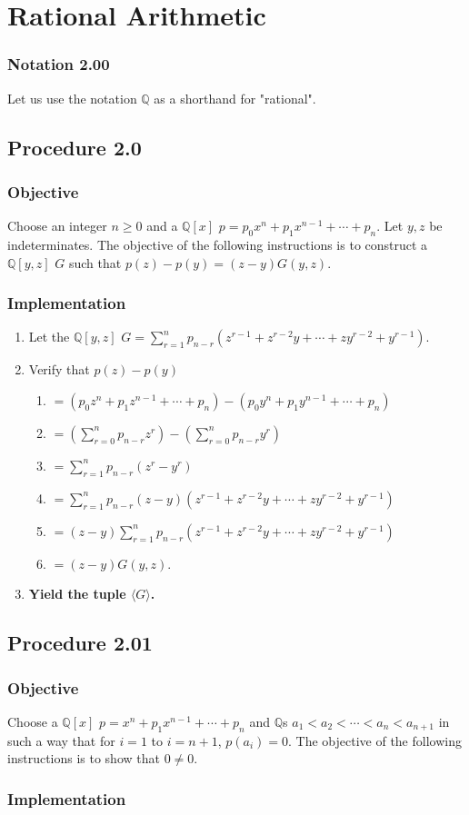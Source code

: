 \documentclass[twocolumn]{article}
\newcommand{\notation}[1]{\subsubsection*{Notation #1}}
\newcommand{\procedure}[2][]{\subsection*{Procedure #2 \ifthenelse{\equal{#1}{}}{}{(#1)}}\label{sec:procedure #2}}
\newcommand{\objective}{\subsubsection*{Objective}}
\newcommand{\implementation}{\subsubsection*{Implementation}}
\begin{document}
	\section{Rational Arithmetic}
		\notation{2.00}
			Let us use the notation $\mathbb{Q}$ as a shorthand for "rational".
		\procedure{2.0}
			\objective
				Choose an integer $n\ge 0$ and a $\mathbb{Q}[x]$ $p=p_0x^n+p_1x^{n-1}+\cdots+p_n$. Let $y,z$ be indeterminates. The objective of the following instructions is to construct a $\mathbb{Q}[y,z]$ $G$ such that $p(z)-p(y)=(z-y)G(y,z)$.
			\implementation
				\begin{enumerate}
					\item Let the $\mathbb{Q}[y,z]$ $G=\sum_{r=1}^n p_{n-r}(z^{r-1}+z^{r-2}y+\cdots+zy^{r-2}+y^{r-1})$.
					\item Verify that $p(z)-p(y)$
					\begin{enumerate}
						\item $=(p_0z^n+p_1z^{n-1}+\cdots+p_n)-(p_0y^n+p_1y^{n-1}+\cdots+p_n)$
						\item $=(\sum_{r=0}^n p_{n-r}z^r)-(\sum_{r=0}^n p_{n-r}y^r)$
						\item $=\sum_{r=1}^n p_{n-r}(z^r-y^r)$
						\item $=\sum_{r=1}^n p_{n-r}(z-y)(z^{r-1}+z^{r-2}y+\cdots+zy^{r-2}+y^{r-1})$
						\item $=(z-y)\sum_{r=1}^n p_{n-r}(z^{r-1}+z^{r-2}y+\cdots+zy^{r-2}+y^{r-1})$
						\item $=(z-y)G(y,z)$.
					\end{enumerate}
					\item \textbf{Yield the tuple $\langle G\rangle$.}
				\end{enumerate}
		\procedure{2.01}
			\objective
				Choose a $\mathbb{Q}[x]$ $p=x^n+p_1x^{n-1}+\cdots+p_n$ and $\mathbb{Q}$s $a_1<a_2<\cdots<a_n<a_{n+1}$ in such a way that for $i=1$ to $i=n+1$, $p(a_i)=0$. The objective of the following instructions is to show that $0\ne 0$.
			\implementation
\end{document}
